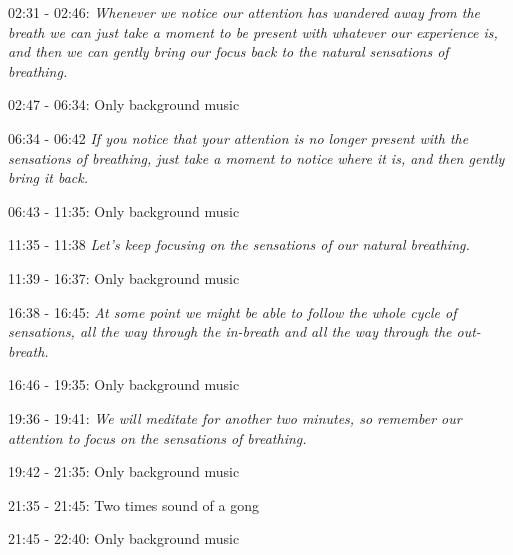 02:31 - 02:46: \textit{Whenever we notice our attention has wandered away from the breath we can just take a moment to be present with whatever our experience is, and then we can gently bring our focus back to the natural sensations of breathing. }

02:47 - 06:34: Only background music

06:34 - 06:42 \textit{If you notice that your attention is no longer present with the sensations of breathing, just take a moment to notice where it is, and then gently bring it back. }

06:43 - 11:35: Only background music

11:35 - 11:38 \textit{Let's keep focusing on the sensations of our natural breathing.}

11:39 - 16:37: Only background music

16:38 - 16:45: \textit{At some point we might be able to follow the whole cycle of sensations, all the way through the in-breath and all the way through the out-breath. }

16:46 - 19:35: Only background music

19:36 - 19:41: \textit{We will meditate for another two minutes, so remember our attention to focus on the sensations of breathing.}

19:42 - 21:35: Only background music 

21:35 - 21:45: Two times sound of a gong  

21:45 - 22:40: Only background music 